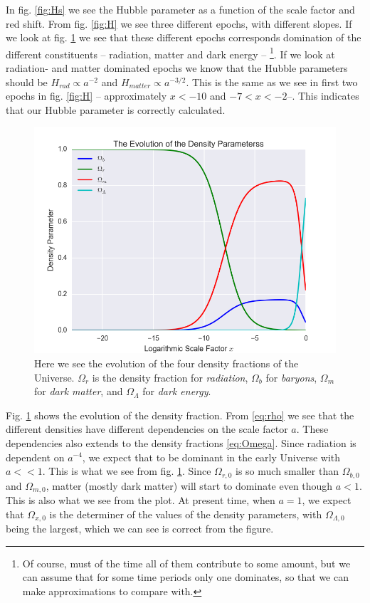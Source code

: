 \documentclass[a4paper,norsk, 10pt]{article}
\begin{document}
In fig. \ref{fig:Hs} we see the Hubble parameter as a function of the scale factor and red shift. From fig. \ref{fig:H} we see three different epochs, with different slopes. If we look at fig. \ref{fig:omega} we see that these different epochs corresponds domination of the different constituents -- radiation, matter and dark energy -- \footnote{Of course, must of the time all of them contribute to some amount, but we can assume that for some time periods only one dominates, so that we can make approximations to compare with.}. If we look at radiation- and matter dominated epochs we know that the Hubble parameters should be $H_{rad} \propto a^{-2}$ and $H_{matter} \propto a^{-3/2}$. This is the same as we see in first two epochs in fig. \ref{fig:H} -- approximately $x < -10$ and $-7<x<-2$--. This indicates that our Hubble parameter is correctly calculated.


\begin{figure}[ht]
     \centering
	{\includegraphics[scale=0.5]{Omega.png}
	\caption{Here we see the evolution of the four density fractions of the Universe. $\Omega_r$ is the density fraction for \textit{radiation}, $\Omega_b$ for \textit{baryons}, $\Omega_m$ for \textit{dark matter}, and $\Omega_{\Lambda}$ for \textit{dark energy}.}\label{fig:omega}}
\end{figure}



Fig. \ref{fig:omega} shows the evolution of the density fraction. From \eqref{eq:rho} we see that the different densities have different dependencies on the scale factor $a$. These dependencies also extends to the density fractions \eqref{eq:Omega}. Since radiation is dependent on $a^{-4}$, we expect that to be dominant in the early Universe with $a << 1$. This is what we see from fig. \ref{fig:omega}. Since $\Omega_{r,0}$ is so much smaller than $\Omega_{b,0}$ and $\Omega_{m,0}$, matter (mostly dark matter) will start to dominate even though $a<1$. This is also what we see from the plot. At present time, when $a=1$, we expect that $\Omega_{x,0}$ is the determiner of the values of the density parameters, with $\Omega_{\Lambda,0}$ being the largest, which we can see is correct from the figure.
\end{document}

